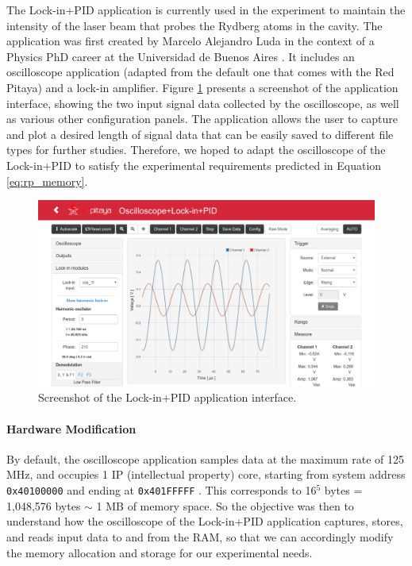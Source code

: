The Lock-in+PID application is currently used in the experiment to maintain the intensity of the laser beam that probes the Rydberg atoms in the cavity. The application was first created by Marcelo Alejandro Luda in the context of a Physics PhD career at the Universidad de Buenos Aires \cite{lipid}. It includes an oscilloscope application (adapted from the default one that comes with the Red Pitaya) and a lock-in amplifier. Figure \ref{fig:ch2_li_pid} presents a screenshot of the application interface, showing the two input signal data collected by the oscilloscope, as well as various other configuration panels. The application allows the user to capture and plot a desired length of signal data that can be easily saved to different file types for further studies. Therefore, we hoped to adapt the oscilloscope of the Lock-in+PID to satisfy the experimental requirements predicted in Equation \eqref{eq:rp_memory}.

\begin{figure}[ht]
    \centering
    \includegraphics[width=0.8\columnwidth]{images/chapter_2/2_li_pid/li_pid.png}
    \caption{Screenshot of the Lock-in+PID application interface.}
    \label{fig:ch2_li_pid}
\end{figure}


\paragraph{Hardware Modification}

By default, the oscilloscope application samples data at the maximum rate of 125 MHz, and occupies 1 IP (intellectual property) core, starting from system address \texttt{0x40100000} and ending at \texttt{0x401FFFFF} \cite{rp}. This corresponds to 16$^5$ bytes = 1,048,576 bytes $\sim$ 1 MB of memory space. So the objective was then to understand how the oscilloscope of the Lock-in+PID application captures, stores, and reads input data to and from the RAM, so that we can accordingly modify the memory allocation and storage for our experimental needs.

